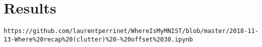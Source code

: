 \section{Results}

\verb|https://github.com/laurentperrinet/WhereIsMyMNIST/blob/master/2018-11-13-Where%20recap%20(clutter)%20-%20offset%2030.ipynb|